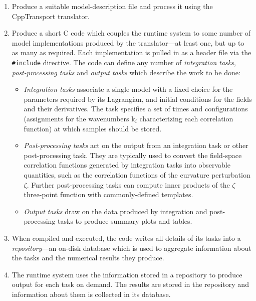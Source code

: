 \documentclass[11pt,a4paper]{article}
\newcommand{\vect}[1]{\bm{\mathrm{{#1}}}}
\newcommand{\packagefont}{\sffamily}
\newcommand{\CppTransport}{{\packagefont CppTransport}}
\newcommand\CC{C\nolinebreak\hspace{-.05em}\raisebox{.4ex}{\relsize{-3}{\textbf{+}}}\nolinebreak\hspace{-.10em}\raisebox{.4ex}{\relsize{-3}{\textbf{+}}}}
\begin{document}
\begin{enumerate}
    \item Produce a suitable model-description file and process it
    using the {\CppTransport} translator.
    
    \item Produce a short {\CC} code
    which couples the runtime system to some number of model implementations produced by
    the translator---at least one, but up to as many as required.
    Each implementation is pulled in as a header file via the \texttt{#include}
    directive.
    The code can define
    any number of \emph{integration tasks},
    \emph{post-processing tasks}
    and \emph{output tasks}
    which describe the work to be done:
    \begin{itemize}
        \item \emph{Integration tasks} associate a single model with a fixed choice
        for the parameters required by its Lagrangian, and initial conditions for
        the fields and their derivatives.
        The task specifies a set of times and
        configurations (assignments for the wavenumbers
        $\vect{k}_i$ characterizing each correlation function)
        at which samples should be stored.
        
        \item \emph{Post-processing tasks} act on the output from an integration
        task or other post-processing task. They are typically used to convert
        the field-space correlation functions generated by integration tasks into
        observable quantities, such as the correlation functions of the
        curvature perturbation $\zeta$.
        Further post-processing tasks can compute inner products of
        the $\zeta$ three-point function with commonly-defined
        templates.
        
        \item \emph{Output tasks} draw on the data produced by integration
        and post-processing tasks to produce summary plots and tables.
    \end{itemize}
    
    \item When compiled and executed, the code writes all details of its tasks into
    a \emph{repository}---an on-disk database which is used to aggregate
    information about the tasks and the numerical results they produce.
    
    \item The runtime system uses the information stored in a repository to
    produce output for each task on demand.
    The results are stored in the repository and information about them
    is collected in its database.
    

\end{enumerate}
\end{document}
